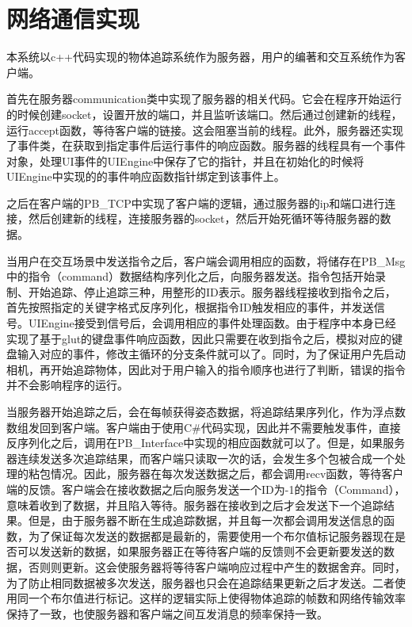 \section{网络通信实现}

本系统以c++代码实现的物体追踪系统作为服务器，用户的编著和交互系统作为客户端。

首先在服务器communication类中实现了服务器的相关代码。它会在程序开始运行的时候创建socket，设置开放的端口，并且监听该端口。然后通过创建新的线程，运行accept函数，等待客户端的链接。这会阻塞当前的线程。此外，服务器还实现了事件类，在获取到指定事件后运行事件的响应函数。服务器的线程具有一个事件对象，处理UI事件的UIEngine中保存了它的指针，并且在初始化的时候将UIEngine中实现的的事件响应函数指针绑定到该事件上。

之后在客户端的PB\_TCP中实现了客户端的逻辑，通过服务器的ip和端口进行连接，然后创建新的线程，连接服务器的socket，然后开始死循环等待服务器的数据。

当用户在交互场景中发送指令之后，客户端会调用相应的函数，将储存在PB\_Msg中的指令（command）数据结构序列化之后，向服务器发送。指令包括开始录制、开始追踪、停止追踪三种，用整形的ID表示。服务器线程接收到指令之后，首先按照指定的关键字格式反序列化，根据指令ID触发相应的事件，并发送信号。UIEngine接受到信号后，会调用相应的事件处理函数。由于程序中本身已经实现了基于glut的键盘事件响应函数，因此只需要在收到指令之后，模拟对应的键盘输入对应的事件，修改主循环的分支条件就可以了。同时，为了保证用户先启动相机，再开始追踪物体，因此对于用户输入的指令顺序也进行了判断，错误的指令并不会影响程序的运行。

当服务器开始追踪之后，会在每帧获得姿态数据，将追踪结果序列化，作为浮点数数组发回到客户端。客户端由于使用C\#代码实现，因此并不需要触发事件，直接反序列化之后，调用在PB\_Interface中实现的相应函数就可以了。但是，如果服务器连续发送多次追踪结果，而客户端只读取一次的话，会发生多个包被合成一个处理的粘包情况。因此，服务器在每次发送数据之后，都会调用recv函数，等待客户端的反馈。客户端会在接收数据之后向服务发送一个ID为-1的指令（Command），意味着收到了数据，并且陷入等待。服务器在接收到之后才会发送下一个追踪结果。但是，由于服务器不断在生成追踪数据，并且每一次都会调用发送信息的函数，为了保证每次发送的数据都是最新的，需要使用一个布尔值标记服务器现在是否可以发送新的数据，如果服务器正在等待客户端的反馈则不会更新要发送的数据，否则则更新。这会使服务器将等待客户端响应过程中产生的数据舍弃。同时，为了防止相同数据被多次发送，服务器也只会在追踪结果更新之后才发送。二者使用同一个布尔值进行标记。这样的逻辑实际上使得物体追踪的帧数和网络传输效率保持了一致，也使服务器和客户端之间互发消息的频率保持一致。


